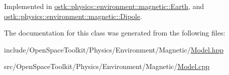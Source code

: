 Implemented in \hyperlink{classostk_1_1physics_1_1environment_1_1magnetic_1_1_earth_a2f39ff75c4a674b6720b27c2c6a0b930}{ostk\+::physics\+::environment\+::magnetic\+::\+Earth}, and \hyperlink{classostk_1_1physics_1_1environment_1_1magnetic_1_1_dipole_ae2c65e41445c91b3efec455fb5077ab1}{ostk\+::physics\+::environment\+::magnetic\+::\+Dipole}.



The documentation for this class was generated from the following files\+:\begin{DoxyCompactItemize}
\item 
include/\+Open\+Space\+Toolkit/\+Physics/\+Environment/\+Magnetic/\hyperlink{_magnetic_2_model_8hpp}{Model.\+hpp}\item 
src/\+Open\+Space\+Toolkit/\+Physics/\+Environment/\+Magnetic/\hyperlink{_magnetic_2_model_8cpp}{Model.\+cpp}\end{DoxyCompactItemize}
